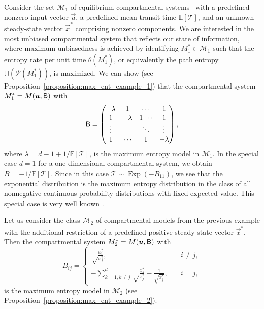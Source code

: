 \documentclass[smallextended]{svjour3}
\makeatletter
\renewcommand*{\eqref}[1]{%
  \hyperref[{#1}]{\textup{\tagform@{\ref*{#1}}}}%
}
\newcommand{\E}{\mathbb{E}}
\newcommand{\TT}{\mathcal{T}}
\renewcommand{\H}{\mathbb{H}}
\newcommand{\Exp}{\operatorname{Exp}}
\newcommand{\suml}{\sum\limits}
\makeatother
\begin{document}
\begin{example}
\label{max_ent_example_1}
Consider the set $\mathcal{M}_1$ of equilibrium compartmental systems~\eqref{eqn:lin_CS_sys} with a predefined nonzero input vector $\vec{u}$, a predefined mean transit time $\E\left[\TT\right]$, and an unknown steady-state vector $\vec{x}^\ast$ comprising nonzero components.
We are interested in the most unbiased compartmental system that reflects our state of information, where maximum unbiasedness is achieved by identifying $M^\ast_1\in\mathcal{M}_1$ such that the entropy rate per unit time $\theta(M^\ast_1)$, or equivalently the path entropy $\H(\mathcal{P}(M^\ast_1))$, is maximized. 
We can show (see Proposition~\ref{proposition:max_ent_example_1}) that the compartmental system $M^\ast_1=M(\vec{u},\tens{B})$ with 
\begin{equation*}
	\mathsf{B} = \begin{pmatrix}
    -\lambda & 1 & \cdots & 1\\
		1 & -\lambda & 1 \cdots & 1 \\
		\vdots & & \ddots & \vdots\\
		1 & \cdots & 1 & -\lambda
  \end{pmatrix},
\end{equation*}
where $\lambda=d-1+1/\E\left[\TT\right]$, 		
is the maximum entropy model in $\mathcal{M}_1$.
In the special case $d=1$ for a one-dimensional compartmental system, we obtain $B=-1/\E\left[\TT\right]$.
Since in this case $\TT\sim\Exp(-B_{11})$, we see that the exponential distribution is the maximum entropy distribution in the class of all nonnegative continuous probability distributions with fixed expected value.
This special case is very well known \citep[Example~12.2.5]{Cover2006}.
\end{example}

\begin{example}
\label{max_ent_example_2}
Let us consider the class $\mathcal{M}_2$ of compartmental models from the previous example with the additional restriction of a predefined positive steady-state vector $\vec{x}^\ast$.
Then the compartmental system $M^\ast_2=M(\vec{u},\tens{B})$ with
\begin{equation*}
	B_{ij} = \begin{cases}
    \sqrt\frac{x_i^\ast}{x_j^\ast},\quad & i\neq j,\\
		-\suml_{k=1,k\neq j}^d \sqrt\frac{x_k^\ast}{x_j^\ast} - \frac{1}{\sqrt{x_j^\ast}}, \quad &i=j,
		\end{cases}
  \end{equation*}
is the maximum entropy model in $\mathcal{M}_2$ (see Proposition~\ref{proposition:max_ent_example_2}).
\end{example}
\end{document}
